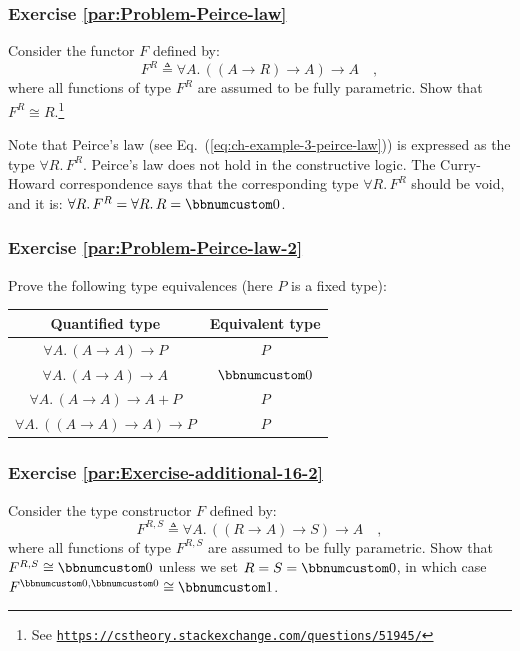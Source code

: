 \subsubsection{Exercise \label{par:Problem-Peirce-law}\ref{par:Problem-Peirce-law}}

Consider the functor $F$ defined by:
\[
F^{R}\triangleq\forall A.\,((A\rightarrow R)\rightarrow A)\rightarrow A\quad,
\]
where all functions of type $F^{R}$ are assumed to be fully parametric.
Show that $F^{R}\cong R$.\footnote{See \texttt{\href{https://cstheory.stackexchange.com/questions/51945/}{https://cstheory.stackexchange.com/questions/51945/}}}

Note that Peirce\textsf{'}s law (see Eq.~(\ref{eq:ch-example-3-peirce-law}))
is expressed as the type $\forall R.\,F^{R}$. Peirce\textsf{'}s law does not
hold in the constructive logic. The Curry-Howard correspondence says
that the corresponding type $\forall R.\,F^{R}$ should be void, and
it is: $\forall R.\,F^{R}=\forall R.\,R=\bbnum 0$. 

\subsubsection{Exercise \label{par:Problem-Peirce-law-2}\ref{par:Problem-Peirce-law-2}}

Prove the following type equivalences (here $P$ is a fixed type):
\begin{center}
\begin{tabular}{|c|c|}
\hline 
\textbf{\footnotesize{}Quantified type} & \textbf{\footnotesize{}Equivalent type}\tabularnewline
\hline 
\hline 
$\forall A.\,(A\rightarrow A)\rightarrow P$ & $P$\tabularnewline
\hline 
$\forall A.\,(A\rightarrow A)\rightarrow A$ & $\bbnum 0$\tabularnewline
\hline 
$\forall A.\,(A\rightarrow A)\rightarrow A+P$ & $P$\tabularnewline
\hline 
$\forall A.\,((A\rightarrow A)\rightarrow A)\rightarrow P$ & $P$\tabularnewline
\hline 
\end{tabular}
\par\end{center}

\subsubsection{Exercise \label{par:Exercise-additional-16-2}\ref{par:Exercise-additional-16-2}}

Consider the type constructor $F$ defined by:
\[
F^{R,S}\triangleq\forall A.\,((R\rightarrow A)\rightarrow S)\rightarrow A\quad,
\]
where all functions of type $F^{R,S}$ are assumed to be fully parametric.
Show that $F^{R,S}\cong\bbnum 0$ unless we set $R=S=\bbnum 0$, in
which case $F^{\bbnum 0,\bbnum 0}\cong\bbnum 1$. 

